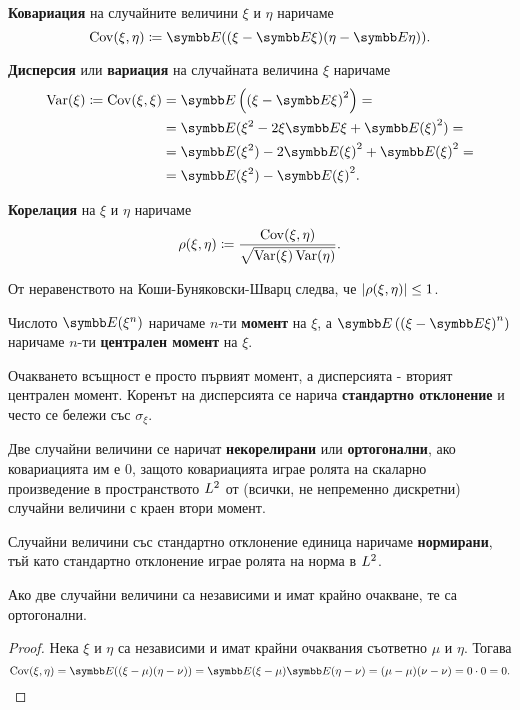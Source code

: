 \documentclass[numbers=endperiod, bibliography=totocnumbered]{scrartcl}
\begin{document}
\begin{definition}
  \textbf{Ковариация} на случайните величини \( \xi \) и \( \eta \) наричаме
  \begin{equation*}
    \Cov(\xi, \eta)
    \coloneqq
    \Expect((\xi - \Expect \xi) (\eta - \Expect \eta)).
  \end{equation*}

  \textbf{Дисперсия} или \textbf{вариация} на случайната величина \( \xi \) наричаме
  \begin{align*}
    \Var(\xi)
    \coloneqq
    \Cov(\xi, \xi)
    &=
    \Expect \left({(\xi - \Expect \xi)}^2 \right)
    = \\ &=
    \Expect(\xi^2 - 2 \xi \Expect \xi + {\Expect(\xi)}^2)
    = \\ &=
    \Expect(\xi^2) - 2 {\Expect(\xi)}^2 + {\Expect(\xi)}^2
    = \\ &=
    \Expect(\xi^2) - {\Expect(\xi)}^2.
  \end{align*}

  \textbf{Корелация} на \( \xi \) и \( \eta \) наричаме
  \begin{equation*}
    \operatorname{\rho}(\xi, \eta)
    \coloneqq
    \frac {\operatorname{Cov}(\xi, \eta)} {\sqrt{\operatorname{Var}(\xi) \operatorname{Var}(\eta)}}.
  \end{equation*}

  От неравенството на Коши-Буняковски-Шварц следва, че \( \left\vert \operatorname{\rho}(\xi, \eta) \right\vert \leq 1 \).

  Числото \( \Expect(\xi^n) \) наричаме \( n \)-ти \textbf{момент} на \( \xi \), а \( \Expect \left( {(\xi - \Expect \xi)}^n \right) \) наричаме \( n \)-ти \textbf{централен момент} на \( \xi \).

  Очакването всъщност е просто първият момент, а дисперсията - вторият централен момент. Коренът на дисперсията се нарича \textbf{стандартно отклонение} и често се бележи със \( \sigma_\xi \).

  Две случайни величини се наричат \textbf{некорелирани} или \textbf{ортогонални}, ако ковариацията им е \( 0 \), защото ковариацията играе ролята на скаларно произведение в пространството \( L^2 \) от (всички, не непременно дискретни) случайни величини с краен втори момент.

  Случайни величини със стандартно отклонение единица наричаме \textbf{нормирани}, тъй като стандартно отклонение играе ролята на норма в \( L^2 \).
\end{definition}

\begin{proposition}\label{thm:independence_implies_orthogonality}
  Ако две случайни величини са независими и имат крайно очакване, те са ортогонални.
\end{proposition}
\begin{proof}
  Нека \( \xi \) и \( \eta \) са независими и имат крайни очаквания съответно \( \mu \) и \( \eta \). Тогава
  \begin{equation*}
    \Cov(\xi, \eta)
    =
    \Expect((\xi - \mu) (\eta - \nu))
    =
    \Expect(\xi - \mu) \Expect(\eta - \nu)
    =
    (\mu - \mu) (\nu - \nu)
    =
    0 \cdot 0
    =
    0.
  \end{equation*}
\end{proof}
\end{document}
